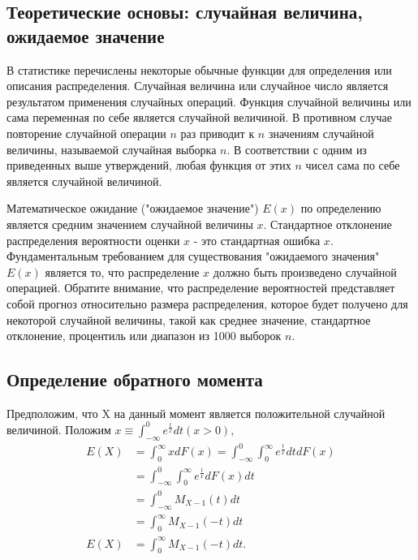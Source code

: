 \documentclass[13pt]{article}
\begin{document}
\subsection{Теоретические основы: случайная величина, ожидаемое значение}\label{theoria}
В статистике перечислены некоторые обычные функции для определения или описания распределения. Случайная величина или случайное число является результатом применения случайных операций. Функция случайной величины или сама переменная по себе является случайной величиной. В противном случае повторение случайной операции $n$ раз приводит к $n$ значениям случайной величины, называемой $\textit{случайная выборка n}$. В соответствии с одним из приведенных выше утверждений, любая функция от этих $n$ чисел сама по себе является случайной величиной.\par
Математическое ожидание ("ожидаемое значение") $E(x)$ по определению является средним значением случайной величины $x$. Стандартное отклонение распределения вероятности оценки $x$ - это стандартная ошибка $x$. Фундаментальным требованием для существования "ожидаемого значения" $E(x)$ является то, что распределение $x$ должно быть произведено случайной операцией. Обратите внимание, что распределение вероятностей представляет собой прогноз относительно размера распределения, которое будет получено для некоторой случайной величины, такой как среднее значение, стандартное отклонение, процентиль или диапазон из 1000 выборок $n$.

\subsection{Определение обратного момента}\label{def}

Предположим, что X на данный момент является положительной случайной величиной. Положим $x \equiv \int_{-\infty}^{0}e^{\frac{t}{x}}dt (x>0),$
\begin{align*}
    E(X) &= \int_{0}^{\infty} xdF(x) = \int_{-\infty}^{0} \int_{0}^{\infty} e^{\frac{t}{x}}dtdF(x)\\
    &= \int_{-\infty}^{0} \int_{0}^{\infty} e^{\frac{t}{x}}dF(x)dt\\
    &= \int_{-\infty}^{0} M_{X-1}(t)dt\\
    &= \int_{0}^{\infty} M_{X-1}(-t)dt\\
    E(X) &= \int_{0}^{\infty} M_{X-1}(-t)dt.\\
\end{align*}
\end{document}
